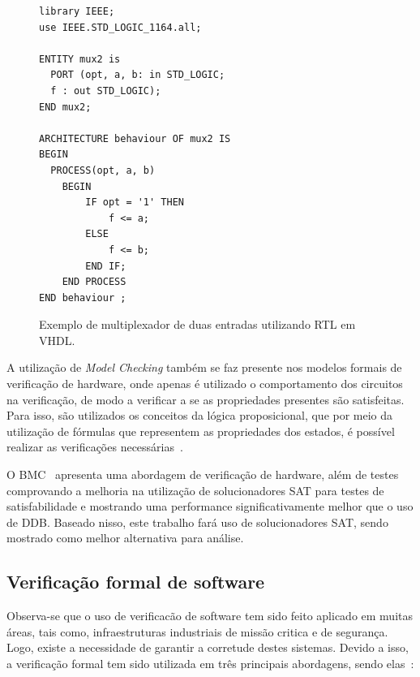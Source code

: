 \begin{figure}[!htp]
\caption{\label{fig:exemplo_RTL} Exemplo de multiplexador de duas entradas utilizando RTL em VHDL.}
	\begin{center}
    \begin{minipage}{0.7\textwidth}
    \begin{lstlisting}       
library IEEE;
use IEEE.STD_LOGIC_1164.all;

ENTITY mux2 is
  PORT (opt, a, b: in STD_LOGIC;
  f : out STD_LOGIC);
END mux2;

ARCHITECTURE behaviour OF mux2 IS
BEGIN
  PROCESS(opt, a, b)
    BEGIN
        IF opt = '1' THEN
            f <= a;
        ELSE
            f <= b;
        END IF;
    END PROCESS
END behaviour ; 
\end{lstlisting}
    \end{minipage}
	\end{center}
\end{figure}

\par
A utilização de \textit{Model Checking} também se faz presente nos modelos formais de verificação de hardware, onde apenas é utilizado o comportamento dos circuitos na verificação, de modo a verificar a se as propriedades  presentes são satisfeitas. Para isso, são utilizados os conceitos da lógica proposicional, que por meio da utilização de fórmulas que representem as propriedades dos estados, é possível realizar as verificações necessárias~\cite{seger1992introduction}.

\par
O BMC~\cite{biere1999symbolic} apresenta uma abordagem de verificação de hardware, além de testes comprovando a melhoria na utilização de solucionadores SAT para testes de satisfabilidade e mostrando uma performance significativamente melhor que o uso de DDB\cite{biere1999symbolic}. Baseado nisso, este trabalho fará uso de solucionadores SAT, sendo mostrado como melhor alternativa para análise.
\subsection{Verificação formal de software}

Observa-se que o uso de verificacão de software tem sido feito aplicado em muitas áreas, tais como, infraestruturas industriais de missão critica e de segurança.  Logo, existe a necessidade de garantir a corretude destes sistemas. Devido a isso, a verificação formal tem sido utilizada em três principais abordagens, sendo elas~\cite{cousot2010gentle,d2008survey}:

